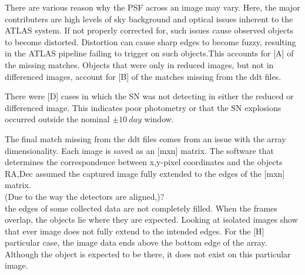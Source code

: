 \documentclass[aps,prb,twocolumn,superscriptaddress]{revtex4-1}
\begin{document}
There are various reason why the PSF across an image may vary.
Here, the major contributers are high levels of sky background and optical 
issues inherent to the ATLAS system. 
If not properly corrected for, such issues cause observed objects to become distorted. 
Distortion can cause sharp edges to become fuzzy, resulting in the ATLAS pipeline 
failing to trigger on such objects.This accounts for [A] of the missing matches.
Objects that were only in reduced images, but not in differenced images, account 
for [B] of the matches missing from the ddt files.

There were [D] cases in which the SN was not detecting in either the reduced or 
differenced image. This indicates poor photometry or that the SN explosions 
occurred outside the nominal $\pm10~day$ window.

The final match missing from the ddt files comes from an issue with the array 
dimensionality. Each image is saved as an [mxn] matrix. The software that 
determines the correspondence between x,y-pixel coordinates and the objects RA,Dec 
assumed the captured image fully extended to the edges of the [mxn] matrix. \\
(Due to the way the detectors are aligned,)?\\
the edges of some collected data are not completely filled. When the frames overlap, 
the objects lie where they are expected. Looking at isolated images show that ever 
image does not fully extend to the intended edges. For the [H] particular case, the 
image data ends above the bottom edge of the array. Although the object is expected 
to be there, it does not exist on this particular image.
\end{document}
